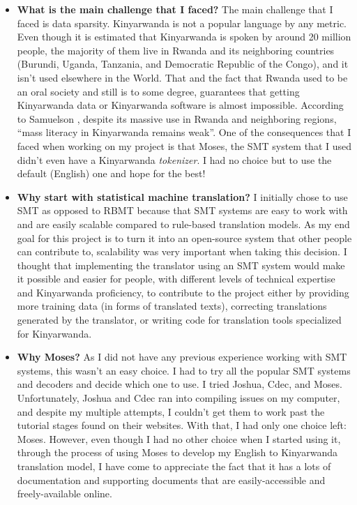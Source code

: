 \begin{itemize}
    \item \textbf{What is the main challenge that I faced?} The main challenge that I faced is data sparsity. Kinyarwanda is not a popular language by any metric. Even though it is estimated that Kinyarwanda is spoken by around 20 million people, the majority of them live in Rwanda and its neighboring countries (Burundi, Uganda, Tanzania, and Democratic Republic of the Congo), and it isn't used elsewhere in the World\cite{kayigema2010loanword}. That and the fact that Rwanda used to be an oral society and still is to some degree, guarantees that getting Kinyarwanda data or  Kinyarwanda software is almost impossible. According to Samuelson \etal, despite its massive use in Rwanda and neighboring regions, ``mass literacy in Kinyarwanda remains weak''\cite{Samuelson2010}. One of the consequences that I faced when working on my project is that Moses, the SMT system that I used didn't even have a Kinyarwanda \textit{tokenizer}. I had no choice but to use the default (English) one and hope for the best! 

    \item \textbf{Why start with statistical machine translation?} I initially chose to use SMT as opposed to RBMT because that SMT systems are easy to work with and are easily scalable compared to rule-based translation models\cite{och2005statistical}. As my end goal for this project is to turn it into an open-source system that other people can contribute to, scalability was very important when taking this decision. I thought that implementing the translator using an SMT system would make it possible and easier for people, with different levels of technical expertise and Kinyarwanda proficiency, to contribute to the project either by providing more training data (in forms of translated texts), correcting translations generated by the translator, or writing code for translation tools specialized for Kinyarwanda. 

    \item \textbf{Why Moses?} As I did not have any previous experience working with SMT systems, this wasn't an easy choice. I had to try all the popular SMT systems and decoders and decide which one to use. I tried Joshua, Cdec, and Moses. Unfortunately, Joshua and Cdec ran into compiling issues on my computer, and despite my multiple attempts, I couldn't get them to work past the tutorial stages found on their websites. With that, I had only one choice left: Moses. However, even though I had no other choice when I started using it, through the process of using Moses to develop my English to Kinyarwanda translation model, I have come to appreciate the fact that it has a lots of documentation and supporting documents that are easily-accessible and freely-available online.
    

\end{itemize}
